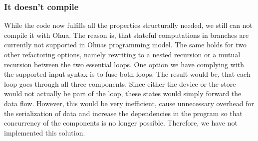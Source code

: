 \subsubsection{It doesn't compile}

While the code now fulfills all the properties structurally needed, we still can not compile it with Ohua. The reason is, that stateful computations in branches are currently not supported in Ohuas programming model. The same holds for two other refactoring options, namely rewriting to a nested recursion or a mutual recursion between the two essential loops. 
One option we have complying with the supported input syntax is to fuse both loops. The result would be, that each loop goes through all three components. Since either the device or the store would not actually be part of the loop, these states would simply forward the data flow. However, this would be very inefficient, cause unnecessary overhead for the serialization of data and increase the dependencies in the program so that concurrency of the components is no longer possible. Therefore, we have not implemented this solution.

